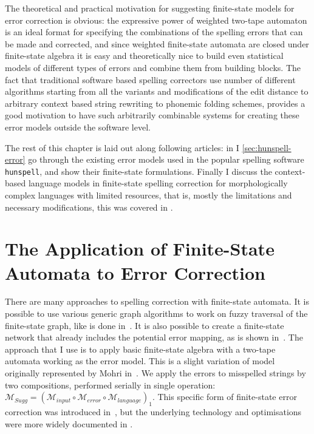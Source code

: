 \documentclass[officiallayout,draft]{unihelcompling}
\begin{document}
The theoretical and practical motivation for suggesting finite-state models for
error correction is obvious: the expressive power of weighted two-tape 
automaton is an ideal format for specifying the combinations of the
spelling errors that can be made and corrected, and since weighted
finite-state automata are closed under finite-state algebra it is easy
and theoretically nice to build even statistical models of different types
of errors and combine them from building blocks. The fact that traditional
software based spelling correctors use number of different algorithms starting
from all the variants and modifications of the edit distance to arbitrary
context based string rewriting to phonemic folding schemes, provides a good
motivation to have such arbitrarily combinable systems for creating these
error models outside the software level.

The rest of this chapter is laid out along following articles: in I
\ref{sec:hunspell-error} go through the existing error models used in the
popular spelling software \texttt{hunspell}, and show their finite-state
formulations.  Finally I discuss the context-based language models in
finite-state spelling correction for morphologically complex languages with
limited resources, that is, mostly the limitations and necessary modifications,
this was covered in \cite{pirinen2012improving}.

\section{The Application of Finite-State Automata to Error Correction}

There are many approaches to spelling correction with finite-state automata.
It is possible to use various generic graph algorithms to work on fuzzy
traversal of the finite-state graph, like is done in~\cite{hulden2009fast}.  It
is also possible to create a finite-state network that already includes the
potential error mapping, as is shown in~\cite{schulz2002fast}. The approach
that I use is to apply basic finite-state algebra with a two-tape automata
working as the error model. This is a slight variation of model originally
represented by Mohri in~\cite{mohri2003edit}. We apply the errors to misspelled
strings by two compositions, performed serially in single operation:
$\mathcal{M}_{Sugg} = (\mathcal{M}_{input} \circ \mathcal{M}_{error} \circ
\mathcal{M}_{language})_1$.  This specific form of finite-state error
correction was introduced in~\cite{pirinen2010finitestate}, but the underlying
technology and optimisations were more widely documented in
\cite{linden2011hfst}.
\end{document}
